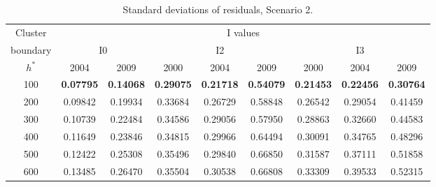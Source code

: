 \documentclass[Journal]{ascelike}
\begin{document}
\begin{table}[htbp]
\begin{center}
\caption{Standard deviations of residuals, Scenario 2.}
\begin{tabular}{l|l|l|l|l|l|l|l|l}
\hline
\multicolumn{1}{c|}{Cluster} & \multicolumn{8}{c}{I values} \\ 
\cline{2-9}
\multicolumn{1}{c|}{boundary} & \multicolumn{2}{c|}{I0} & \multicolumn{3}{c|}{I2} & \multicolumn{3}{c}{I3} \\ 
\cline{2-9}
\multicolumn{1}{c|}{$h^*$} & \multicolumn{1}{c|}{2004} & \multicolumn{1}{c|}{2009} & \multicolumn{1}{c|}{2000} & \multicolumn{1}{c|}{2004} & \multicolumn{1}{c|}{2009} & \multicolumn{1}{c|}{2000} & \multicolumn{1}{c|}{2004} & \multicolumn{1}{c}{2009} \\ 
\hline
\multicolumn{1}{c|}{100} & \multicolumn{1}{c|}{\textbf{0.07795}} & \multicolumn{1}{c|}{\textbf{0.14068}} & \multicolumn{1}{c|}{\textbf{0.29075}} & \multicolumn{1}{c|}{\textbf{0.21718}} & \multicolumn{1}{c|}{\textbf{0.54079}} & \multicolumn{1}{c|}{\textbf{0.21453}} & \multicolumn{1}{c|}{\textbf{0.22456}} & \multicolumn{1}{c}{\textbf{0.30764}} \\ 
\multicolumn{1}{c|}{200} & \multicolumn{1}{c|}{0.09842} & \multicolumn{1}{c|}{0.19934} & \multicolumn{1}{c|}{0.33684} & \multicolumn{1}{c|}{0.26729} & \multicolumn{1}{c|}{0.58848} & \multicolumn{1}{c|}{0.26542} & \multicolumn{1}{c|}{0.29054} & \multicolumn{1}{c}{0.41459} \\ 
\multicolumn{1}{c|}{300} & \multicolumn{1}{c|}{0.10739} & \multicolumn{1}{c|}{0.22484} & \multicolumn{1}{c|}{0.34586} & \multicolumn{1}{c|}{0.29056} & \multicolumn{1}{c|}{0.57950} & \multicolumn{1}{c|}{0.28863} & \multicolumn{1}{c|}{0.32660} & \multicolumn{1}{c}{0.44583} \\ 
\multicolumn{1}{c|}{400} & \multicolumn{1}{c|}{0.11649} & \multicolumn{1}{c|}{0.23846} & \multicolumn{1}{c|}{0.34815} & \multicolumn{1}{c|}{0.29966} & \multicolumn{1}{c|}{0.64494} & \multicolumn{1}{c|}{0.30091} & \multicolumn{1}{c|}{0.34765} & \multicolumn{1}{c}{0.48296} \\ 
\multicolumn{1}{c|}{500} & \multicolumn{1}{c|}{0.12422} & \multicolumn{1}{c|}{0.25308} & \multicolumn{1}{c|}{0.35496} & \multicolumn{1}{c|}{0.29840} & \multicolumn{1}{c|}{0.66850} & \multicolumn{1}{c|}{0.31587} & \multicolumn{1}{c|}{0.37111} & \multicolumn{1}{c}{0.51858} \\ 
\multicolumn{1}{c|}{600} & \multicolumn{1}{c|}{0.13485} & \multicolumn{1}{c|}{0.26470} & \multicolumn{1}{c|}{0.35504} & \multicolumn{1}{c|}{0.30538} & \multicolumn{1}{c|}{0.66808} & \multicolumn{1}{c|}{0.33309} & \multicolumn{1}{c|}{0.39533} & \multicolumn{1}{c}{0.52315} \\ 

\end{tabular}
\end{center}
\end{table}
\end{document}
